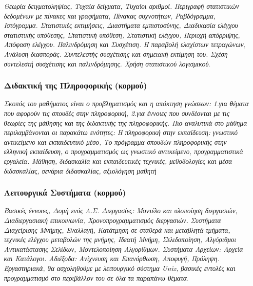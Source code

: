 \emph{Θεωρία δειγματοληψίας, Τυχαία δείγματα, Τυχαίοι αριθμοί. Περιγραφή
στατιστικών δεδομένων με πίνακες και γραφήματα, Πίνακας συχνοτήτων,
Ραβδόγραμμα, Ιστόγραμμα. Στατιστικές εκτιμήσεις, Διαστήματα
εμπιστοσύνης, Διαδικασία ελέγχου στατιστικής υπόθεσης, Στατιστική
υπόθεση, Στατιστική ελέγχου, Περιοχή απόρριψης, Απόφαση ελέγχου.
Παλινδρόμηση και Συσχέτιση. Η παραβολή ελαχίστων τετραγώνων, Ανάλυση
διασποράς. Συντελεστής συσχέτισης και σημειακή εκτίμηση του. Σχέση
συντελεστή συσχέτισης και παλινδρόμησης. Χρήση στατιστικού λογισμικού.}

\hypertarget{ux3b4ux3b9ux3b4ux3b1ux3baux3c4ux3b9ux3baux3ae-ux3c4ux3b7ux3c2-ux3c0ux3bbux3b7ux3c1ux3bfux3c6ux3bfux3c1ux3b9ux3baux3aeux3c2-ux3baux3bfux3c1ux3bcux3bfux3cd}{%
\subsubsection{Διδακτική της Πληροφορικής
(κορμού)}\label{ux3b4ux3b9ux3b4ux3b1ux3baux3c4ux3b9ux3baux3ae-ux3c4ux3b7ux3c2-ux3c0ux3bbux3b7ux3c1ux3bfux3c6ux3bfux3c1ux3b9ux3baux3aeux3c2-ux3baux3bfux3c1ux3bcux3bfux3cd}}

\emph{Σκοπός του μαθήματος είναι ο προβληματισμός και η απόκτηση
γνώσεων: 1.για θέματα που αφορούν τις σπουδές στην πληροφορική, 2.για
έννοιες που συνδέονται με τις θεωρίες της μάθησης και της διδακτικής της
πληροφορικής. Πιο αναλυτικά στο μάθημα περιλαμβάνονται οι παρακάτω
ενότητες: Η πληροφορική στην εκπαίδευση: γνωστικό αντικείμενο και
εκπαιδευτικό μέσο, Το πρόγραμμα σπουδών πληροφορικής στην ελληνική
εκπαίδευση, ο προγραμματισμός ως γνωστικό αντικείμενο, προγραμματιστικά
εργαλεία. Μάθηση, διδασκαλία και εκπαιδευτικές τεχνικές, μεθοδολογίες
και μέσα διδασκαλίας, σενάρια διδασκαλίας, αξιολόγηση μαθητή}

\hypertarget{ux3bbux3b5ux3b9ux3c4ux3bfux3c5ux3c1ux3b3ux3b9ux3baux3ac-ux3c3ux3c5ux3c3ux3c4ux3aeux3bcux3b1ux3c4ux3b1-ux3baux3bfux3c1ux3bcux3bfux3cd}{%
\subsubsection{Λειτουργικά Συστήματα
(κορμού)}\label{ux3bbux3b5ux3b9ux3c4ux3bfux3c5ux3c1ux3b3ux3b9ux3baux3ac-ux3c3ux3c5ux3c3ux3c4ux3aeux3bcux3b1ux3c4ux3b1-ux3baux3bfux3c1ux3bcux3bfux3cd}}

\emph{Βασικές έννοιες, Δομή ενός Λ.Σ. Διεργασίες: Μοντέλο και υλοποίηση
διεργασιών, Διαδιεργασιακή επικοινωνία, Χρονοπρογραμματισμός διεργασιών.
Συστήματα Διαχείρισης Μνήμης, Εναλλαγή, Κατάτμηση σε σταθερά και
μεταβλητά τμήματα, τεχνικές ελέγχου μεταβολών της μνήμης, Ιδεατή Μνήμη,
Σελιδοποίηση, Αλγόριθμοι Αντικατάστασης Σελίδων, Μοντελοποίηση
Αλγορίθμων. Συστήματα Αρχείων: Αρχεία και Κατάλογοι. Αδιέξοδα: Ανίχνευση
και Επανόρθωση, Αποφυγή, Πρόληψη. Εργαστηριακά, θα ασχοληθούμε με
λειτουργικό σύστημα Unix, βασικές εντολές και προγραμματισμό στο
περιβάλλον του σε όλα τα παραπάνω θέματα.}

